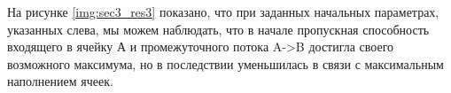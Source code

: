 
На рисунке \ref{img:sec3_res3} показано, что при заданных начальных параметрах, указанных слева, мы можем наблюдать, что в начале пропускная способность входящего в ячейку А и промежуточного потока A->B достигла своего возможного максимума, но в последствии уменьшилась в связи с максимальным наполнением ячеек.


\clearpage